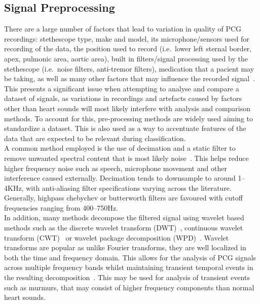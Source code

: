 \documentclass[titlepage, 12pt]{scrartcl} \usepackage{enumitem}
\begin{document}
\subsection{Signal Preprocessing}
There are a large number of factors that lead to variation in quality of PCG
recordings: stethescope type, make and model, its microphone/sensors used for
recording of the data, the position used to record (i.e.\ lower left sternal
border, apex, pulmonic area, aortic area), built in filters/signal processing
used by the stethescope (i.e.\ noise filters, anti-tremor filters), medication that
a pacient may be taking, as well as many other factors that may influence the
recorded signal~\parencite[p.4]{Pavlopoulos2004}. This presents a significant
issue when attempting to analyse and compare a dataset of signals, as
variations in recordings and artefacts caused by factors other than heart
sounds will most likely interfere with analysis and comparison methods. To
account for this, pre-processing methods are widely used aiming to standardize
a dataset. This is also used as a way to accentuate features of the data that
are expected to be relevant during classification.\\

A common method employed is the use of decimation and a static filter to remove
unwanted spectral content that is most likely noise~\parencite{Liang1997a,
Homsi2016, Springer2016, Gupta2007}. This helps reduce higher frequency noise
such as speech, microphone movement and other interference caused externally.
Decimation tends to downsample to around 1--4KHz, with anti-aliasing filter
specifications varying across the literature. Generally, highpass chebychev or
butterworth filters are favoured with cutoff frequencies ranging from
400--750Hz.\\

In addition, many methods decompose the filtered signal using wavelet based
methods such as the discrete wavelet transform
(DWT)~\parencite{Liang1997a, Pavlopoulos2004}, continuous
wavelet transform (CWT)~\parencite{Langley2016} or wavelet
package decomposition (WPD)~\parencite{Liang1998}.
Wavelet transforms are popular as unlike Fourier transforms, they are well
localized in both the time and frequency domain. This allows for the analysis
of PCG signals across multiple frequency bands whilst maintaining transient
temporal events in the resulting decomposition~\parencite[p.93]{Ari2008}.
This may be used for analysis of transient events such as murmurs, that may
consist of higher frequency components than normal heart sounds.
\end{document}
